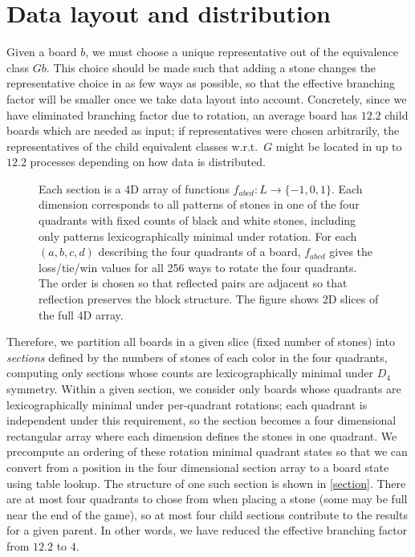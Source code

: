 \documentclass[conference]{IEEEtran}
\newcommand{\wrt}{w.\thinspace r.\thinspace t.\ }
\begin{document}
\section{Data layout and distribution}

Given a board $b$, we must choose a unique representative out of the equivalence class $Gb$.  This choice
should be made such that adding a stone changes the representative choice in as few ways as possible, so
that the effective branching factor will be smaller once we take data layout into account.
Concretely, since we have eliminated
branching factor due to rotation, an average board has $12.2$ child boards which are needed as input; if
representatives were chosen arbitrarily, the representatives of the child equivalent classes \wrt $G$
might be located in up to $12.2$ processes depending on how data is distributed.

\begin{figure}
\begin{center}

\end{center}
\vspace{-.15in}
\caption{Each section is a 4D array of functions $f_{abcd} : L \to \{-1,0,1\}$.  Each dimension
corresponds to all patterns of stones in one of the four quadrants with fixed counts of black and white
stones, including only patterns lexicographically minimal under rotation.  For each $(a,b,c,d)$
describing the four quadrants of a board, $f_{abcd}$ gives the loss/tie/win values for all 256 ways to rotate the
four quadrants.  The order is chosen so that reflected pairs are adjacent so that
reflection preserves the block structure.  The figure shows 2D slices of the full 4D array.}
\label{section}
\end{figure}

Therefore, we partition all boards in a given slice (fixed number of stones) into \emph{sections} defined by the
numbers of stones of each color in the four quadrants, computing only sections whose counts are lexicographically
minimal under $D_4$ symmetry.  Within a given section, we consider only boards whose quadrants are lexicographically
minimal under per-quadrant rotations; each quadrant is independent under this requirement, so the section becomes
a four dimensional rectangular array where each dimension defines the stones in one quadrant.  We precompute an
ordering of these rotation minimal quadrant states so that we can convert from a position in the four dimensional
section array to a board state using table lookup.  The structure of one such section is shown in \autoref{section}.
There are at most four quadrants to chose from when placing a stone (some may be full near the end of the game),
so at most four child sections contribute to the results for a given parent.  In other words, we have reduced the
effective branching factor from $12.2$ to $4$.
\end{document}
